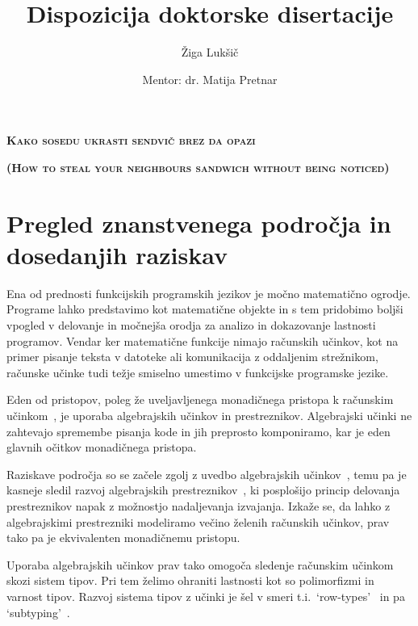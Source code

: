 \documentclass{article}
\title{Dispozicija doktorske disertacije}
\author{Žiga Lukšič \and Mentor: dr. Matija Pretnar}
\date{}
\begin{document}
\maketitle

\vspace{-10mm}
\begin{center}
  \Large{\textsc{\textbf{Kako sosedu ukrasti sendvič brez da opazi}}}

  \Large{\textsc{\textbf{(How to steal your neighbours sandwich without being noticed)}}}
\end{center}

\section*{Pregled znanstvenega področja in dosedanjih raziskav}

Ena od prednosti funkcijskih programskih jezikov je močno matematično ogrodje. Programe lahko predstavimo kot matematične objekte in s tem pridobimo boljši vpogled v delovanje in močnejša orodja za analizo in dokazovanje lastnosti programov. Vendar ker matematične funkcije nimajo računskih učinkov, kot na primer pisanje teksta v datoteke ali komunikacija z oddaljenim strežnikom, računske učinke tudi težje smiselno umestimo v funkcijske programske jezike.

Eden od pristopov, poleg že uveljavljenega monadičnega pristopa k računskim učinkom~\cite{DBLP:journals/iandc/Moggi91}, je uporaba algebrajskih učinkov in prestreznikov. Algebrajski učinki ne zahtevajo spremembe pisanja kode in jih preprosto komponiramo, kar je eden glavnih očitkov monadičnega pristopa.



Raziskave področja so se začele zgolj z uvedbo algebrajskih učinkov~\cite{DBLP:conf/fossacs/PlotkinP01, DBLP:journals/acs/PlotkinP03}, temu pa je kasneje sledil razvoj algebrajskih prestreznikov~\cite{DBLP:conf/esop/PlotkinP09}, ki posplošijo princip delovanja prestreznikov napak z možnostjo nadaljevanja izvajanja. Izkaže se, da lahko z algebrajskimi prestrezniki modeliramo večino želenih računskih učinkov, prav tako pa je ekvivalenten monadičnemu pristopu. 

Uporaba algebrajskih učinkov prav tako omogoča sledenje računskim učinkom skozi sistem tipov. Pri tem želimo ohraniti lastnosti kot so polimorfizmi in varnost tipov. Razvoj sistema tipov z učinki je šel v smeri t.i.\ `row-types'~\cite{DBLP:conf/icfp/HillerstromL16} in pa `subtyping'~\cite{DBLP:conf/esop/SalehKPS18}. 
\end{document}
